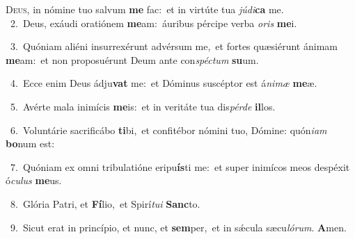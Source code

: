\lettrine{\initial\textcolor{\initialcolor}{D}}{eus,} in nómine tuo salvum \textbf{me} fac:~\star et in virtúte tua \textit{jú}\-\textit{di}\textbf{ca} me.\\
{\numbfont\textcolor{\numbcolor}{~2.}}~Deus, exáudi oratiónem \textbf{me}\-am:~\star áuribus pércipe verba \textit{o}\-\textit{ris} \textbf{me}\-i.\par
{\numbfont\textcolor{\numbcolor}{~3.}}~Quóniam aliéni insurrexérunt advérsum me,~\dagger et fortes quæsiérunt ánimam \textbf{me}\-am:~\star et non proposuérunt Deum ante con\-\textit{spéc}\-\textit{tum} \textbf{su}\-um.\par
{\numbfont\textcolor{\numbcolor}{~4.}}~Ecce enim Deus ádju\textbf{vat} me:~\star et Dóminus suscéptor est á\-\textit{ni}\-\textit{mæ} \textbf{me}\-æ.\par
{\numbfont\textcolor{\numbcolor}{~5.}}~Avérte mala inimícis \textbf{me}\-is:~\star et in veritáte tua dis\-\textit{pér}\-\textit{de} \textbf{il}\-los.\par
{\numbfont\textcolor{\numbcolor}{~6.}}~Voluntárie sacrificábo \textbf{ti}\-bi,~\star et confitébor nómini tuo, Dómine: quón\-\textit{i}\-\textit{am} \textbf{bo}\-num est:\par
{\numbfont\textcolor{\numbcolor}{~7.}}~Quóniam ex omni tribulatióne eripu\-\textbf{ís}\-ti me:~\star et super inimícos meos despéxit ó\-\textit{cu}\-\textit{lus} \textbf{me}\-us.\par
{\numbfont\textcolor{\numbcolor}{~8.}}~Glória Patri, et \textbf{Fí}\-lio,~\star et Spirí\-\textit{tu}\-\textit{i} \textbf{Sanc}\-to.\par
{\numbfont\textcolor{\numbcolor}{~9.}}~Sicut erat in princípio, et nunc, et \textbf{sem}\-per,~\star et in sǽcula sæcu\-\textit{ló}\-\textit{rum}. \textbf{A}\-men.\par
